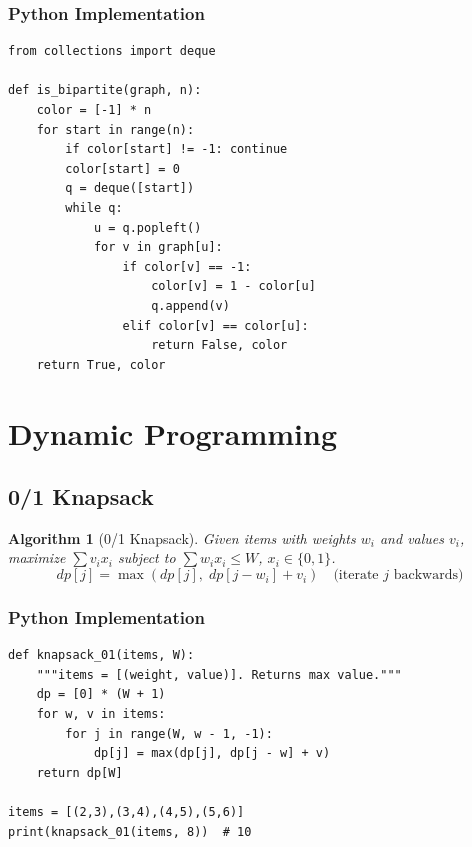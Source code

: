 \documentclass[10pt,a4paper]{article}
\theoremstyle{cpstyle}
\newtheorem{algorithm}[theorem]{Algorithm}
\begin{document}
\subsubsection{Python Implementation}
\begin{lstlisting}[caption={Bipartite check via 2-coloring}]
from collections import deque

def is_bipartite(graph, n):
    color = [-1] * n
    for start in range(n):
        if color[start] != -1: continue
        color[start] = 0
        q = deque([start])
        while q:
            u = q.popleft()
            for v in graph[u]:
                if color[v] == -1:
                    color[v] = 1 - color[u]
                    q.append(v)
                elif color[v] == color[u]:
                    return False, color
    return True, color
\end{lstlisting}

\clearpage
\section{Dynamic Programming}

\subsection{0/1 Knapsack}

\begin{algorithm}[0/1 Knapsack]
Given items with weights $w_i$ and values $v_i$, maximize $\sum v_i x_i$ subject to $\sum w_i x_i \leq W$, $x_i \in \{0,1\}$.
\[
  dp[j] = \max(dp[j],\; dp[j - w_i] + v_i) \quad \text{(iterate } j \text{ backwards)}
\]
\end{algorithm}

\subsubsection{Python Implementation}
\begin{lstlisting}[caption={0/1 Knapsack}]
def knapsack_01(items, W):
    """items = [(weight, value)]. Returns max value."""
    dp = [0] * (W + 1)
    for w, v in items:
        for j in range(W, w - 1, -1):
            dp[j] = max(dp[j], dp[j - w] + v)
    return dp[W]

items = [(2,3),(3,4),(4,5),(5,6)]
print(knapsack_01(items, 8))  # 10
\end{lstlisting}
\end{document}
